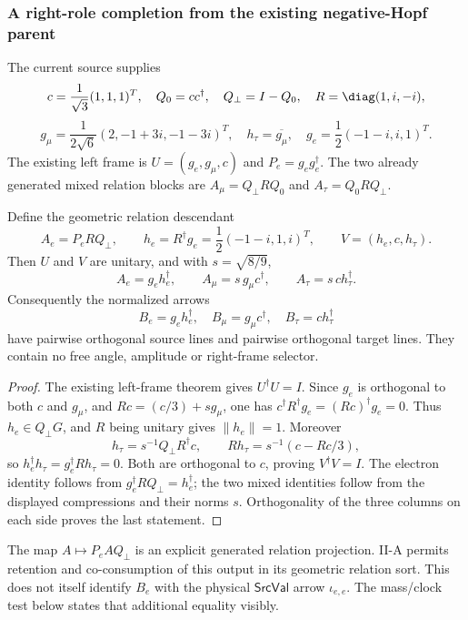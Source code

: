 \documentclass[12pt,a4paper]{article}
\begin{document}
\subsubsection{A right-role completion from the existing negative-Hopf parent}
The current source supplies
\[
 c=\frac1{\sqrt3}(1,1,1)^T,\quad Q_0=cc^\dagger,\quad Q_\perp=I-Q_0,
 \quad R=\diag(1,i,-i),
\]
\[
 g_\mu=\frac1{2\sqrt6}(2,-1+3i,-1-3i)^T,\quad
 h_\tau=\overline{g_\mu},\quad
 g_e=\frac12(-1-i,i,1)^T.
\]
The existing left frame is $U=(g_e,g_\mu,c)$ and $P_e=g_eg_e^\dagger$.
The two already generated mixed relation blocks are
$A_\mu=Q_\perp RQ_0$ and $A_\tau=Q_0RQ_\perp$.

\begin{theorem}
\label{p6:thm:v2168-right-completion}
Define the geometric relation descendant
\[
 A_e=P_eRQ_\perp,\qquad
 h_e=R^\dagger g_e=\frac12(-1-i,1,i)^T,
 \qquad V=(h_e,c,h_\tau).
\]
Then $U$ and $V$ are unitary, and with $s=\sqrt{8/9}$,
\[
 A_e=g_eh_e^\dagger,\qquad
 A_\mu=s\,g_\mu c^\dagger,\qquad
 A_\tau=s\,c h_\tau^\dagger.
\]
Consequently the normalized arrows
\[
 B_e=g_eh_e^\dagger,\quad B_\mu=g_\mu c^\dagger,\quad
 B_\tau=c h_\tau^\dagger
\]
have pairwise orthogonal source lines and pairwise orthogonal target lines.
They contain no free angle, amplitude or right-frame selector.
\end{theorem}
\begin{proof}
The existing left-frame theorem gives $U^\dagger U=I$.
Since $g_e$ is orthogonal to both $c$ and $g_\mu$, and
$Rc=(c/3)+s g_\mu$, one has
$c^\dagger R^\dagger g_e=(Rc)^\dagger g_e=0$.
Thus $h_e\in Q_\perp G$, and $R$ being unitary gives $\|h_e\|=1$.
Moreover
\[
 h_\tau=s^{-1}Q_\perp R^\dagger c,
 \qquad Rh_\tau=s^{-1}(c-Rc/3),
\]
so $h_e^\dagger h_\tau=g_e^\dagger Rh_\tau=0$.
Both are orthogonal to $c$, proving $V^\dagger V=I$.
The electron identity follows from
$g_e^\dagger RQ_\perp=h_e^\dagger$; the two mixed identities follow from
the displayed compressions and their norms $s$.
Orthogonality of the three columns on each side proves the last statement.
\end{proof}

The map $A\mapsto P_eAQ_\perp$ is an explicit generated relation projection.
II-A permits retention and co-consumption of this output in its geometric
relation sort. This does not itself identify $B_e$ with the physical
$\mathsf{SrcVal}$ arrow $\iota_{e,e}$. The mass/clock test below states
that additional equality visibly.
\end{document}
